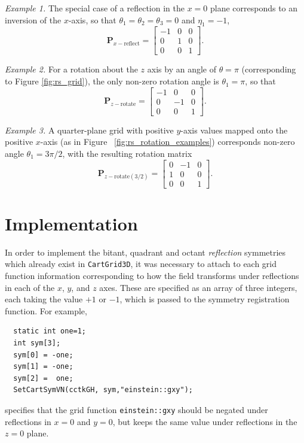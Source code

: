 \documentclass{article}
\begin{document}
\emph{Example 1.} The special case of a reflection in the $x=0$ plane
corresponds to an inversion of the $x$-axis, so that
$\theta_1=\theta_2=\theta_3=0$ and $\eta_1=-1$,
\begin{equation}
  \mathbf{P}_{x-\mathrm{reflect}} = \left[
    \begin{array}{ccc}
      -1 & 0 & 0 \\
       0 & 1 & 0 \\
       0 & 0 & 1
    \end{array}
    \right].
\end{equation}

\emph{Example 2.} For a rotation about the $z$ axis by an angle of
$\theta=\pi$ (corresponding to Figure \ref{fig:rs_grid}), the only
non-zero rotation angle is $\theta_1=\pi$, so that
\begin{equation}
  \mathbf{P}_{z-\mathrm{rotate}} = \left[
    \begin{array}{ccc}
      -1 &  0 & 0 \\
       0 & -1 & 0 \\
       0 &  0 & 1
    \end{array}
    \right].
\end{equation}

\emph{Example 3.} A quarter-plane grid with positive $y$-axis values
mapped onto the positive $x$-axis (as in Figure\nobreak~
\ref{fig:rs_rotation_examples}) corresponds non-zero angle
$\theta_1=3\pi/2$, with the resulting rotation matrix
\begin{equation}
  \mathbf{P}_{z-\mathrm{rotate(3/2)}} = \left[
    \begin{array}{ccc}
       0 & -1 & 0 \\
       1 &  0 & 0 \\
       0 &  0 & 1
    \end{array}
    \right].
\end{equation}

\section{Implementation}
\label{sec:rs_implementation}

In order to implement the bitant, quadrant and octant
\emph{reflection} symmetries which already exist in
\texttt{CartGrid3D}, it was necessary to attach to each grid function
information corresponding to how the field transforms under
reflections in each of the $x$, $y$, and $z$ axes.  These are
specified as an array of three integers, each taking the value $+1$ or
$-1$, which is passed to the symmetry registration function. For
example,
\begin{verbatim}
  static int one=1;
  int sym[3];
  sym[0] = -one;
  sym[1] = -one;
  sym[2] =  one;
  SetCartSymVN(cctkGH, sym,"einstein::gxy");
\end{verbatim}
specifies that the grid function \texttt{einstein::gxy} should be
negated under reflections in $x=0$ and $y=0$, but keeps the same value
under reflections in the $z=0$ plane.\\
\end{document}
